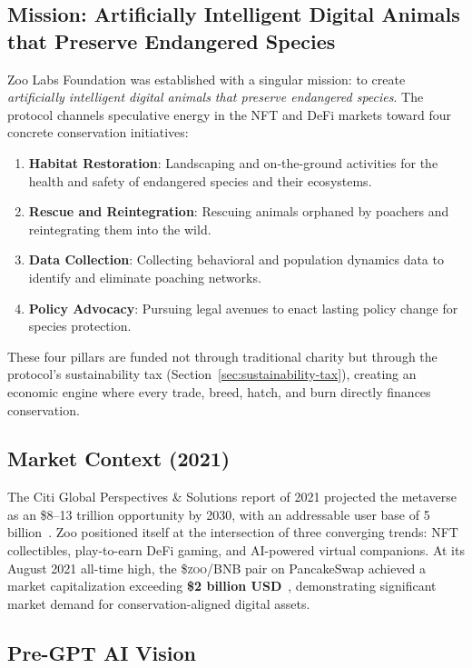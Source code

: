 \documentclass[11pt,letterpaper]{article}
\newcommand{\ZOO}{\$\textsc{zoo}}
\begin{document}
\subsection{Mission: Artificially Intelligent Digital Animals that Preserve Endangered Species}

Zoo Labs Foundation was established with a singular mission: to create \emph{artificially intelligent digital animals that preserve endangered species}.  The protocol channels speculative energy in the NFT and DeFi markets toward four concrete conservation initiatives:

\begin{enumerate}
    \item \textbf{Habitat Restoration}: Landscaping and on-the-ground activities for the health and safety of endangered species and their ecosystems.
    \item \textbf{Rescue and Reintegration}: Rescuing animals orphaned by poachers and reintegrating them into the wild.
    \item \textbf{Data Collection}: Collecting behavioral and population dynamics data to identify and eliminate poaching networks.
    \item \textbf{Policy Advocacy}: Pursuing legal avenues to enact lasting policy change for species protection.
\end{enumerate}

These four pillars are funded not through traditional charity but through the protocol's sustainability tax (Section~\ref{sec:sustainability-tax}), creating an economic engine where every trade, breed, hatch, and burn directly finances conservation.

\subsection{Market Context (2021)}

The Citi Global Perspectives \& Solutions report of 2021 projected the metaverse as an \$8--13 trillion opportunity by 2030, with an addressable user base of 5 billion~\cite{citi2021metaverse}.  Zoo positioned itself at the intersection of three converging trends: NFT collectibles, play-to-earn DeFi gaming, and AI-powered virtual companions.  At its August 2021 all-time high, the \ZOO{}/BNB pair on PancakeSwap achieved a market capitalization exceeding \textbf{\$2 billion USD}~\cite{poocoin2021}, demonstrating significant market demand for conservation-aligned digital assets.

\subsection{Pre-GPT AI Vision}
\end{document}
